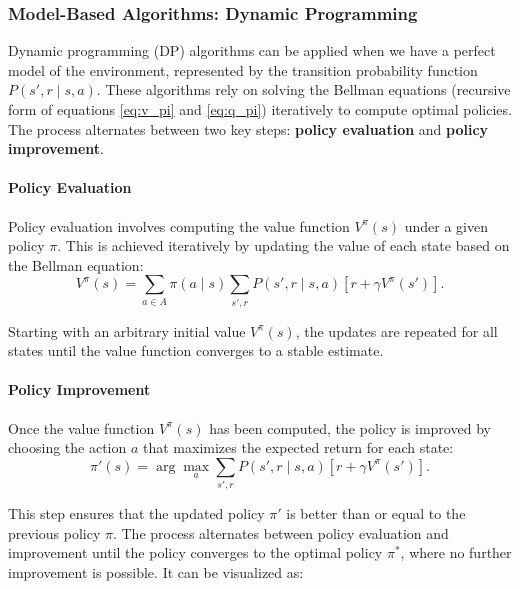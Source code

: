 \subsubsection{\textbf{Model-Based Algorithms: Dynamic Programming}}

\hspace{1em} Dynamic programming (DP) algorithms can be applied when we have a perfect model
of the environment, represented by the transition probability function \( P(s',
r \mid s, a) \). These algorithms rely on solving the Bellman equations
(recursive form of equations \ref{eq:v_pi} and \ref{eq:q_pi}) iteratively to
compute optimal policies. The process alternates between two key steps:
\textbf{policy evaluation} and \textbf{policy improvement}.

\paragraph{Policy Evaluation}
Policy evaluation involves computing the value function \( V^\pi(s) \) under a
given policy \( \pi \). This is achieved iteratively by updating the value of
each state based on the Bellman equation:
\begin{equation}
    V^\pi(s) = \sum_{a \in A} \pi(a \mid s) \sum_{s', r} P(s', r \mid s, a) \left[ r + \gamma V^\pi(s') \right].
\end{equation}

Starting with an arbitrary initial value \( V^\pi(s) \), the updates are
repeated for all states until the value function converges to a stable
estimate\cite{bg2}.

\paragraph{Policy Improvement}
Once the value function \( V^\pi(s) \) has been computed, the policy is
improved by choosing the action \( a \) that maximizes the expected return for
each state:
\begin{equation}
    \pi'(s) = \arg\max_a \sum_{s', r} P(s', r \mid s, a) \left[ r + \gamma V^\pi(s') \right].
\end{equation}

This step ensures that the updated policy \( \pi' \) is better than or equal to
the previous policy \( \pi \). The process alternates between policy evaluation
and improvement until the policy converges to the optimal policy \( \pi^* \),
where no further improvement is possible. It can be visualized as:

